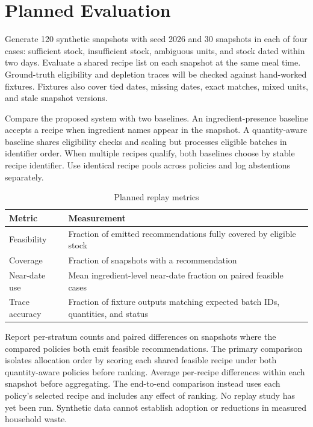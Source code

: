 \section{Planned Evaluation}
Generate 120 synthetic snapshots with seed 2026 and 30 snapshots in each of four cases: sufficient stock, insufficient stock, ambiguous units, and stock dated within two days. Evaluate a shared recipe list on each snapshot at the same meal time. Ground-truth eligibility and depletion traces will be checked against hand-worked fixtures. Fixtures also cover tied dates, missing dates, exact matches, mixed units, and stale snapshot versions.

Compare the proposed system with two baselines. An ingredient-presence baseline accepts a recipe when ingredient names appear in the snapshot. A quantity-aware baseline shares eligibility checks and scaling but processes eligible batches in identifier order. When multiple recipes qualify, both baselines choose by stable recipe identifier. Use identical recipe pools across policies and log abstentions separately.

\begin{table}[t]
\centering
\caption{Planned replay metrics}
\begin{tabular}{p{}p{}}
\hline
Metric & Measurement \\
\hline
Feasibility & Fraction of emitted recommendations fully covered by eligible stock \\
Coverage & Fraction of snapshots with a recommendation \\
Near-date use & Mean ingredient-level near-date fraction on paired feasible cases \\
Trace accuracy & Fraction of fixture outputs matching expected batch IDs, quantities, and status \\
\hline
\end{tabular}
\end{table}

Report per-stratum counts and paired differences on snapshots where the compared policies both emit feasible recommendations. The primary comparison isolates allocation order by scoring each shared feasible recipe under both quantity-aware policies before ranking. Average per-recipe differences within each snapshot before aggregating. The end-to-end comparison instead uses each policy's selected recipe and includes any effect of ranking. No replay study has yet been run. Synthetic data cannot establish adoption or reductions in measured household waste.
